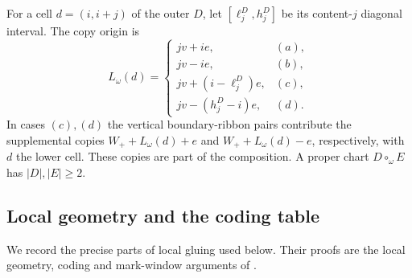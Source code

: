 \documentclass[11pt,a4paper]{amsart}
\numberwithin{equation}{section}
\theoremstyle{plain}
\theoremstyle{definition}
\begin{document}
For a cell \(d=(i,i+j)\) of the outer \(D\), let \([\ell_j^D,h_j^D]\) be its
content-\(j\) diagonal interval.  The copy origin is
\[
 L_\omega(d)=
 \begin{cases}
 jv+ie,&(a),\\
 jv-ie,&(b),\\
 jv+(i-\ell_j^D)e,&(c),\\
 jv-(h_j^D-i)e,&(d).
 \end{cases}
\]
In cases \((c),(d)\) the vertical boundary-ribbon pairs contribute the supplemental
copies \(W_++L_\omega(d)+e\) and \(W_++L_\omega(d)-e\), respectively, with \(d\) the
lower cell.  These copies are part of the composition.  A proper chart
\(D\circ_\omega E\) has \(|D|,|E|\ge2\).


\subsection{Local geometry and the coding table}

We record the precise parts of local gluing used below.  Their proofs are the
local geometry, coding and mark-window arguments of
\cite{Shields2026Gluing}.
\end{document}
